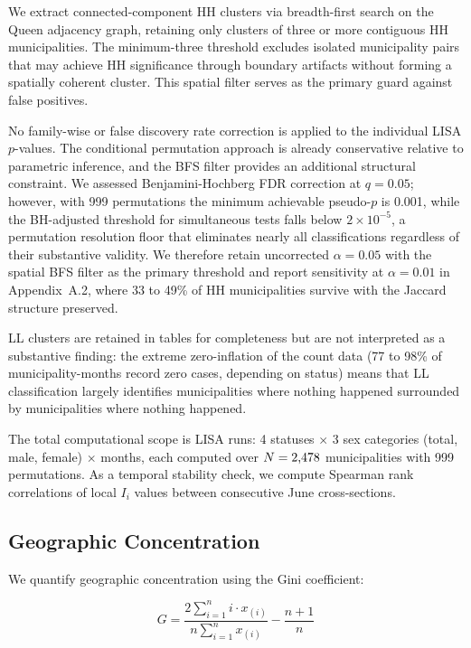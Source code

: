 We extract connected-component HH clusters via breadth-first search on the Queen adjacency graph, retaining only clusters of three or more contiguous HH municipalities.
The minimum-three threshold excludes isolated municipality pairs that may achieve HH significance through boundary artifacts without forming a spatially coherent cluster.
This spatial filter serves as the primary guard against false positives.

No family-wise or false discovery rate correction is applied to the individual LISA $p$-values.
The conditional permutation approach is already conservative relative to parametric inference, and the BFS filter provides an additional structural constraint.
We assessed Benjamini-Hochberg FDR correction at $q = 0.05$; however, with 999 permutations the minimum achievable pseudo-$p$ is 0.001, while the BH-adjusted threshold for \nmunis{} simultaneous tests falls below $2 \times 10^{-5}$, a permutation resolution floor that eliminates nearly all classifications regardless of their substantive validity.
We therefore retain uncorrected $\alpha = 0.05$ with the spatial BFS filter as the primary threshold and report sensitivity at $\alpha = 0.01$ in Appendix~A.2, where 33 to 49\% of HH municipalities survive with the Jaccard structure preserved.

LL clusters are retained in tables for completeness but are not interpreted as a substantive finding: the extreme zero-inflation of the count data (77 to 98\% of municipality-months record zero cases, depending on status) means that LL classification largely identifies municipalities where nothing happened surrounded by municipalities where nothing happened.

The total computational scope is \nLISAruns{} LISA runs: 4 statuses $\times$ 3 sex categories (total, male, female) $\times$ \nmonths{} months, each computed over $N = \text{2,478{}}$ municipalities with 999 permutations.
As a temporal stability check, we compute Spearman rank correlations of local $I_i$ values between consecutive June cross-sections.

\subsection{Geographic Concentration}
\label{sec:concentration}

We quantify geographic concentration using the Gini coefficient:

\begin{equation}
  G = \frac{2\sum_{i=1}^{n} i \cdot x_{(i)}}{n \sum_{i=1}^{n} x_{(i)}}
      - \frac{n+1}{n}
  \label{eq:gini}
\end{equation}

